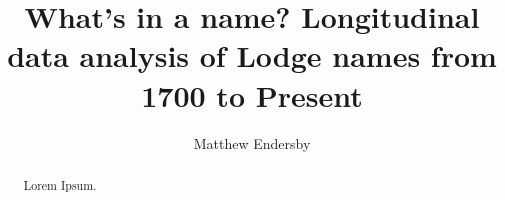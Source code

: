 \documentclass[]{article}
\title{What's in a name? Longitudinal data analysis of Lodge names from 1700 to Present}
\author{Matthew Endersby}
\begin{document}
\maketitle

\begin{abstract}

Lorem Ipsum.

\end{abstract}

\section{}
\end{document}
